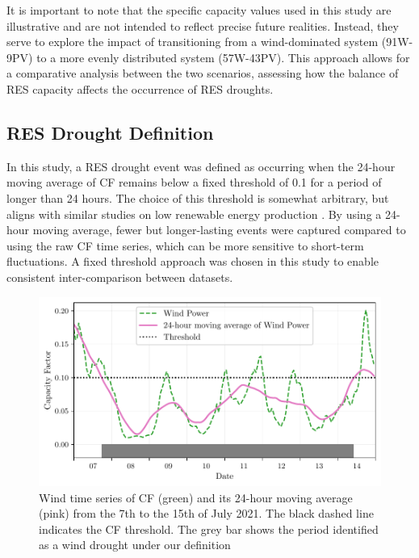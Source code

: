 \documentclass[preprint, 12pt]{elsarticle}
\begin{document}
It is important to note that the specific capacity values used in this study are illustrative and are not intended to reflect precise future realities. Instead, they serve to explore the impact of transitioning from a wind-dominated system (91W-9PV) to a more evenly distributed system (57W-43PV). This approach allows for a comparative analysis between the two scenarios, assessing how the balance of RES capacity affects the occurrence of RES droughts.

\subsection{RES Drought Definition}
\label{sec:res_drought}

In this study, a RES drought event was defined as occurring when the 24-hour moving average of CF remains below a fixed threshold of 0.1 for a period of longer than 24 hours. The choice of this threshold is somewhat arbitrary, but aligns with similar studies on low renewable energy production \citep{kaspar2019drought, ohba2022drought, mayer2023drought}. By using a 24-hour moving average, fewer but longer-lasting events were captured compared to using the raw CF time series, which can be more sensitive to short-term fluctuations. A fixed threshold approach was chosen in this study to enable consistent inter-comparison between datasets.

\begin{figure}[ht!]
	\centering
	\includegraphics[width=\textwidth]{droughts_methodology.pdf}
	\caption{Wind time series of CF (green) and its 24-hour moving average (pink) from the 7th to the 15th of July 2021. The black dashed line indicates the CF threshold. The grey bar shows the period identified as a wind drought under our definition}
	\label{fig:find_res_droughts}
\end{figure}
\end{document}

